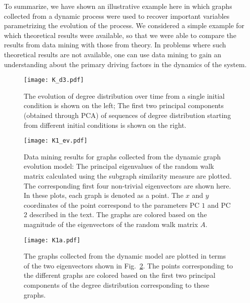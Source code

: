 To summarize, we have shown an illustrative example here in which
graphs collected from a dynamic process were used to recover important
variables parametrizing the evolution of the process.
% 
We considered a simple example for which theoretical results were
available, so that we were able to compare the results from data
mining with those from theory.
% 
In problems where such theoretical results are not available, one can
use data mining to gain an understanding about the primary driving
factors in the dynamics of the system.
% 


\begin{figure}
  \begin{center}
    \texttt{[image: K\_d3.pdf]}
    \caption{\label{fig:K_d3} The evolution of degree distribution
      over time from a single initial condition is shown on the left;
      The first two principal components (obtained through PCA) of
      sequences of degree distribution starting from different initial
      conditions is shown on the right.  }
  \end{center}
\end{figure}

\begin{figure}
  \begin{center}
    \texttt{[image: K1\_ev.pdf]}
    \caption{\label{fig:K1} Data mining results for graphs collected
      from the dynamic graph evolution model: The principal
      eigenvalues of the random walk matrix calculated using the
      subgraph similarity measure are plotted.  The corresponding
      first four non-trivial eigenvectors are shown here. In these
      plots, each graph is denoted as a point.  The $x$ and $y$
      coordinates of the point correspond to the parameters PC $1$ and
      PC $2$ described in the text.  The graphs are colored based on
      the magnitude of the eigenvectors of the random walk matrix $A$.
    }
  \end{center}
\end{figure}

\begin{figure}
  \begin{center}
    \texttt{[image: K1a.pdf]}
    \caption{\label{fig:K1a} The graphs collected from the dynamic
      model are plotted in terms of the two eigenvectors shown in
      Fig.~\ref{fig:K1}. The points corresponding to the different
      graphs are colored based on the first two principal components
      of the degree distribution corresponding to these graphs.  }
  \end{center}
\end{figure}

